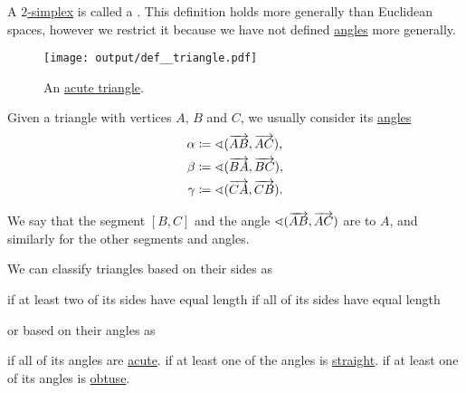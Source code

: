 \begin{definition}\label{def:triangle}
  A \hyperref[def:simplex]{\( 2 \)-simplex} is called a . This definition holds more generally than Euclidean spaces, however we restrict it because we have not defined \hyperref[def:angle]{angles} more generally.

  \begin{figure}[!ht]
    \centering
    \texttt{[image: output/def\_\_triangle.pdf]}
    \caption{An \hyperref[def:triangle/acute]{acute triangle}.}\label{fig:def:triangle}
  \end{figure}

  Given a triangle with vertices \( A \), \( B \) and \( C \), we usually consider its \hyperref[def:angle]{ angles}
  \begin{align*}
    \alpha &\coloneqq \sphericalangle(\overrightarrow{AB}, \overrightarrow{AC}), \\
    \beta  &\coloneqq \sphericalangle(\overrightarrow{BA}, \overrightarrow{BC}), \\
    \gamma &\coloneqq \sphericalangle(\overrightarrow{CA}, \overrightarrow{CB}).
  \end{align*}

  We say that the segment \( [B, C] \) and the angle \( \sphericalangle(\overrightarrow{AB}, \overrightarrow{AC}) \) are  to \( A \), and similarly for the other segments and angles.

  We can classify triangles based on their sides as
  \begin{thmenum}
      if at least two of its sides have equal length
      if all of its sides have equal length
  \end{thmenum}
  or based on their angles as
  \begin{thmenum}
      if all of its angles are \hyperref[def:angle/measure/acute]{acute}.
      if at least one of the angles is \hyperref[def:angle/measure/straight]{straight}.
      if at least one of its angles is \hyperref[def:angle/measure/obtuse]{obtuse}.
  \end{thmenum}
\end{definition}

